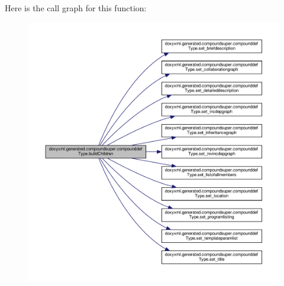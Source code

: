 Here is the call graph for this function\+:
\nopagebreak
\begin{figure}[H]
\begin{center}
\leavevmode
\includegraphics[width=350pt]{dc/d6a/classdoxyxml_1_1generated_1_1compoundsuper_1_1compounddefType_a45104ba0306670dd8b33a8b61dcdcb77_cgraph}
\end{center}
\end{figure}





